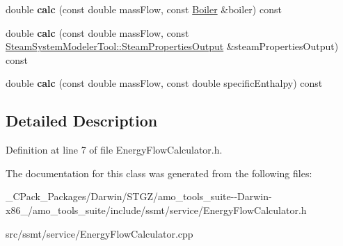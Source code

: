 \begin{DoxyCompactItemize}
\item 
\mbox{\label{class_energy_flow_calculator_a07bdd911e1e2ccb8fbf464dd8a9f5ed7}} 
double {\bfseries calc} (const double mass\+Flow, const \hyperlink{class_boiler}{Boiler} \&boiler) const
\item 
\mbox{\label{class_energy_flow_calculator_a4a2fe600ab51c4ea0bdd5b6561c36387}} 
double {\bfseries calc} (const double mass\+Flow, const \hyperlink{struct_steam_system_modeler_tool_1_1_steam_properties_output}{Steam\+System\+Modeler\+Tool\+::\+Steam\+Properties\+Output} \&steam\+Properties\+Output) const
\item 
\mbox{\label{class_energy_flow_calculator_a7963289a05637035bf3f7a2d6b3e5b4f}} 
double {\bfseries calc} (const double mass\+Flow, const double specific\+Enthalpy) const
\end{DoxyCompactItemize}


\subsection{Detailed Description}


Definition at line 7 of file Energy\+Flow\+Calculator.\+h.



The documentation for this class was generated from the following files\+:\begin{DoxyCompactItemize}
\item 
\+\_\+\+C\+Pack\+\_\+\+Packages/\+Darwin/\+S\+T\+G\+Z/amo\+\_\+tools\+\_\+suite-\/-\/\+Darwin-\/x86\+\_/amo\+\_\+tools\+\_\+suite/include/ssmt/service/Energy\+Flow\+Calculator.\+h\item 
src/ssmt/service/Energy\+Flow\+Calculator.\+cpp\end{DoxyCompactItemize}
